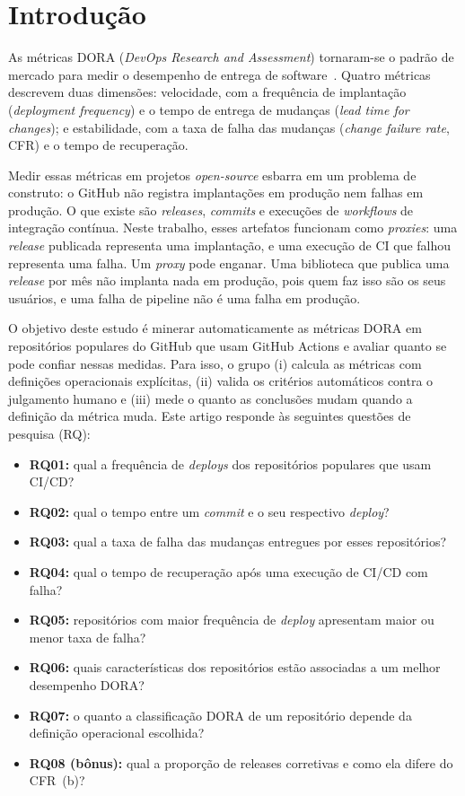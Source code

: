 \section{Introdução}
\label{sec:introducao}

As métricas DORA (\textit{DevOps Research and Assessment}) tornaram-se o padrão de mercado para
medir o desempenho de entrega de software~\cite{forsgren2018accelerate,dora}. Quatro métricas
descrevem duas dimensões: velocidade, com a frequência de implantação (\textit{deployment
frequency}) e o tempo de entrega de mudanças (\textit{lead time for changes}); e estabilidade,
com a taxa de falha das mudanças (\textit{change failure rate}, CFR) e o tempo de recuperação.

Medir essas métricas em projetos \textit{open-source} esbarra em um problema de construto: o GitHub
não registra implantações em produção nem falhas em produção. O que existe são \textit{releases},
\textit{commits} e execuções de \textit{workflows} de integração contínua. Neste trabalho, esses
artefatos funcionam como \textit{proxies}: uma \textit{release} publicada representa uma
implantação, e uma execução de CI que falhou representa uma falha. Um \textit{proxy} pode enganar.
Uma biblioteca que publica uma \textit{release} por mês não implanta nada em produção, pois quem
faz isso são os seus usuários, e uma falha de pipeline não é uma falha em produção.

O objetivo deste estudo é minerar automaticamente as métricas DORA em repositórios populares do
GitHub que usam GitHub Actions e avaliar quanto se pode confiar nessas medidas. Para isso, o
grupo (i) calcula as métricas com definições operacionais explícitas, (ii) valida os critérios
automáticos contra o julgamento humano e (iii) mede o quanto as conclusões mudam quando a
definição da métrica muda. Este artigo responde às seguintes questões de pesquisa (RQ):

\begin{itemize}
  \item \textbf{RQ01:} qual a frequência de \textit{deploys} dos repositórios populares que usam CI/CD?
  \item \textbf{RQ02:} qual o tempo entre um \textit{commit} e o seu respectivo \textit{deploy}?
  \item \textbf{RQ03:} qual a taxa de falha das mudanças entregues por esses repositórios?
  \item \textbf{RQ04:} qual o tempo de recuperação após uma execução de CI/CD com falha?
  \item \textbf{RQ05:} repositórios com maior frequência de \textit{deploy} apresentam maior ou menor taxa de falha?
  \item \textbf{RQ06:} quais características dos repositórios estão associadas a um melhor desempenho DORA?
  \item \textbf{RQ07:} o quanto a classificação DORA de um repositório depende da definição operacional escolhida?
  \item \textbf{RQ08 (bônus):} qual a proporção de releases corretivas e como ela difere do CFR~(b)?
\end{itemize}

